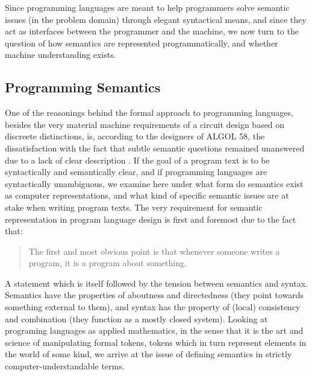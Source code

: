 Since programming languages are meant to help programmers solve semantic issues (in the problem domain) through elegant syntactical means, and since they act as interfaces between the programmer and the machine, we now turn to the question of how semantics are represented programmatically, and whether machine understanding exists.

\subsection{Programming Semantics}
\label{subsec:programming-semantics}


One of the reasonings behind the formal approach to programming languages, besides the very material machine requirements of a circuit design based on discreete distinctions, is, according to the designers of ALGOL 58, the dissatisfaction with the fact that subtle semantic questions remained unanswered due to a lack of clear description \citep{sethi_programming_1996}. If the goal of a program text is to be syntactically and semantically clear, and if programming languages are syntactically unambiguous, we examine here under what form do semantics exist as computer representations, and what kind of specific semantic issues are at stake when writing program texts. The very requirement for semantic representation in program language design is first and foremost due to the fact that:

\begin{quote}
  The first and most obvious point is that whenever someone writes a program, it is a program about something. \citep{winograd_language_1982}
\end{quote}

A statement which is itself followed by the tension between semantics and syntax. Semantics have the properties of aboutness and directedness (they point towards something external to them), and syntax has the property of (local) consistency and combination (they function as a mostly closed system). Looking at programing languages as applied mathematics, in the sense that it is the art and science of manipulating formal tokens, tokens which in turn represent elements in the world of some kind, we arrive at the issue of defining semantics in strictly computer-understandable terms.

